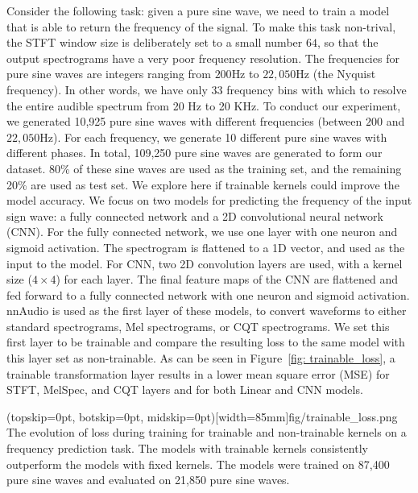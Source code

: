 \documentclass{ieeeaccess}
\begin{document}
 
Consider the following task: given a pure sine wave, we need to train a model that is able to return the frequency of the signal. To make this task non-trival, the STFT window size is deliberately set to a small number $64$, so that the output spectrograms have a very poor frequency resolution. The frequencies for pure sine waves are integers ranging from $200$Hz to $22,050$Hz (the Nyquist frequency). In other words, we have only $33$ frequency bins with which to resolve the entire audible spectrum from 20 Hz to 20 KHz. To conduct our experiment, we generated 10,925 pure sine waves with different frequencies (between $200$ and $22,050$Hz). For each frequency, we generate 10 different pure sine waves with different phases. In total, 109,250 pure sine waves are generated to form our dataset. 80\% of these sine waves are used as the training set, and the remaining 20\% are used as test set. We explore here if trainable kernels could improve the model accuracy. We focus on two models for predicting the frequency of the input sign wave: a fully connected network and a 2D convolutional neural network (CNN). For the fully connected network, we use one layer with one neuron and sigmoid activation. The spectrogram is flattened to a 1D vector, and used as the input to the model. For CNN, two 2D convolution layers are used, with a kernel size ($4\times4$) for each layer. The final feature maps of the CNN are flattened and fed forward to a fully connected network with one neuron and sigmoid activation. nnAudio is used as the first layer of these models, to convert waveforms to either standard spectrograms, Mel spectrograms, or CQT spectrograms. We set this first layer to be trainable and compare the resulting loss to the same model with this layer set as non-trainable. As can be seen in Figure~\ref{fig: trainable_loss}, a trainable transformation layer results in a lower mean square error (MSE) for STFT, MelSpec, and CQT layers and for both Linear and CNN models.


\Figure(topskip=0pt, botskip=0pt, midskip=0pt)[width=85mm]{fig/trainable_loss.png}
{The evolution of loss during training for trainable and non-trainable kernels on a frequency prediction task. The models with trainable kernels consistently outperform the models with fixed kernels. The models were trained on 87,400 pure sine waves and evaluated on 21,850 pure sine waves.\label{fig: trainable_loss}}
\end{document}
